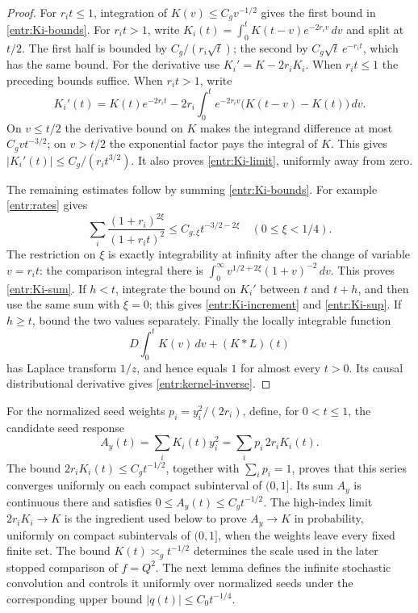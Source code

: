 \begin{proof}
For \(r_it\le1\), integration of \(K(v)\le C_gv^{-1/2}\)
gives the first bound in \eqref{entr:Ki-bounds}.  For \(r_it>1\),
write \(K_i(t)=\int_0^t K(t-v)e^{-2r_iv}\,dv\) and split at \(t/2\).
The first half is bounded by \(C_g/(r_i\sqrt t)\); the second by
\(C_g\sqrt t\,e^{-r_it}\), which has the same bound.  For the
derivative use \(K_i'=K-2r_iK_i\).  When \(r_it\le1\) the preceding
bounds suffice.  When \(r_it>1\), write
\[
 K_i'(t)=K(t)e^{-2r_it}
  -2r_i\int_0^t e^{-2r_iv}\bigl(K(t-v)-K(t)\bigr)\,dv.
\]
On \(v\le t/2\) the derivative bound on \(K\) makes the integrand
difference at most \(C_g v t^{-3/2}\); on \(v>t/2\) the exponential
factor pays the integral of \(K\).  This gives
\(|K_i'(t)|\le C_g/(r_it^{3/2})\).  It also proves
\eqref{entr:Ki-limit}, uniformly away from zero.

The remaining estimates follow by summing
\eqref{entr:Ki-bounds}.  For example \eqref{entr:rates} gives
\[
 \sum_i\frac{(1+r_i)^{2\xi}}{(1+r_it)^2}
 \le C_{g,\xi}t^{-3/2-2\xi}\quad(0\le\xi<1/4).
\]
The restriction on \(\xi\) is exactly integrability at infinity after
the change of variable \(v=r_it\): the comparison integral there is
\(\int_0^\infty v^{1/2+2\xi}(1+v)^{-2}\,dv\).
This proves \eqref{entr:Ki-sum}.  If \(h<t\), integrate the bound on
\(K_i'\) between \(t\) and \(t+h\), and then use the same sum with
\(\xi=0\); this gives \eqref{entr:Ki-increment} and
\eqref{entr:Ki-sup}.  If \(h\ge t\), bound the two values separately.
Finally the locally integrable function
\[
 D\int_0^tK(v)\,dv+(K*L)(t)
\]
has Laplace transform \(1/z\), and hence equals \(1\) for almost
every \(t>0\).  Its causal distributional derivative gives
\eqref{entr:kernel-inverse}.
\end{proof}

For the normalized seed weights \(p_i=y_i^2/(2r_i)\), define, for
\(0<t\le1\), the candidate seed response
\[
 A_y(t)=\sum_iK_i(t)y_i^2=\sum_i p_i\,2r_iK_i(t).
\]
The bound \(2r_iK_i(t)\le C_g t^{-1/2}\), together with
\(\sum_i p_i=1\), proves that this series converges uniformly on
each compact subinterval of \((0,1]\).  Its sum \(A_y\) is continuous
there and satisfies \(0\le A_y(t)\le C_g t^{-1/2}\).
The high-index limit \(2r_iK_i\to K\) is the ingredient used below
to prove \(A_y\to K\) in probability, uniformly on compact subintervals
of \((0,1]\), when the weights leave every fixed finite set.
The bound \(K(t)\asymp_g t^{-1/2}\) determines the scale used in
the later stopped comparison of \(f=Q^2\).  The next lemma defines
the infinite stochastic convolution and controls it uniformly over
normalized seeds under the corresponding upper bound
\(|q(t)|\le C_0t^{-1/4}\).

